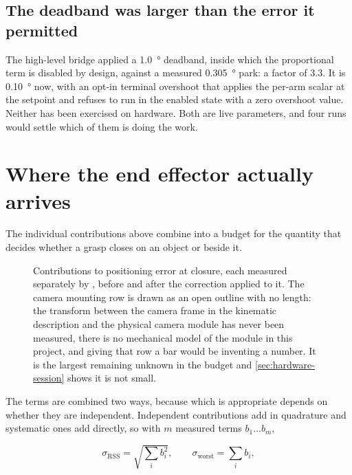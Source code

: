 \subsection{The deadband was larger than the error it permitted}

The high-level bridge applied a \SI{1.0}{\degree} deadband, inside which the
proportional term is disabled by design, against a measured
\SI{0.305}{\degree} park: a factor of \num{3.3}. It is \SI{0.10}{\degree} now,
with an opt-in terminal overshoot that applies the per-arm scalar at the
setpoint and refuses to run in the enabled state with a zero overshoot value.
Neither has been exercised on hardware. Both are live parameters, and four
runs would settle which of them is doing the work.

\section{Where the end effector actually arrives}

The individual contributions above combine into a budget for the quantity that
decides whether a grasp closes on an object or beside it.

\begin{figure}[htbp]
  \centering
  
  \caption[Positioning error budget]{Contributions to positioning error at
  closure, each measured separately by
  , before and after the correction
  applied to it. The camera mounting row is drawn as an open outline with no
  length: the transform between the camera frame in the kinematic description
  and the physical camera module has never been measured, there is no
  mechanical model of the module in this project, and giving that row a bar
  would be inventing a number. It is the largest remaining unknown in the
  budget and \cref{sec:hardware-session} shows it is not small.}
  \label{fig:budget}
\end{figure}

The terms are combined two ways, because which is appropriate depends on
whether they are independent. Independent contributions add in quadrature and
systematic ones add directly, so with $m$ measured terms $b_1 \dots b_m$,

\begin{equation}
  \label{eq:budget}
  \sigma_{\text{RSS}} = \sqrt{\textstyle\sum_{i} b_i^2},
  \qquad
  \sigma_{\text{worst}} = \textstyle\sum_{i} b_i ,
\end{equation}

